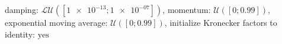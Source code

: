 damping: $\mathcal{LU}([\num[scientific-notation=true]{1e-13}; \num[scientific-notation=true]{1e-07}])$, momentum: $\mathcal{U}([0; \num[scientific-notation=true]{0.99}])$, exponential moving average: $\mathcal{U}([0; \num[scientific-notation=true]{0.99}])$, initialize Kronecker factors to identity: $\text{yes}$